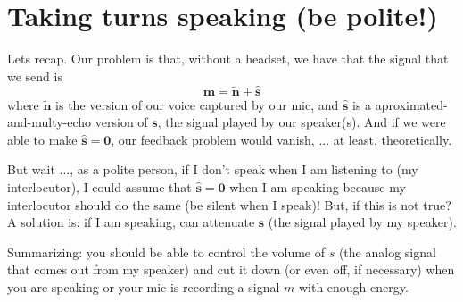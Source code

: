 \section{Taking turns speaking (be polite!)}
Lets recap. Our problem is that, without a headset, we have that the
signal that we send is
\begin{equation}
    \mathbf{m} = \tilde{\mathbf{n}} + \hat{\mathbf{s}}
\end{equation}
where $\tilde{\mathbf{n}}$ is the version of our voice captured by our
mic, and $\hat{\mathbf{s}}$ is a aproximated-and-multy-echo version of
$\mathbf{s}$, the signal played by our speaker(s). And if we were able
to make $\hat{\mathbf{s}}=\mathbf{0}$, our feedback problem would
vanish, ... at least, theoretically.

But wait ..., as a polite person, if I don't speak when I am listening
to (my interlocutor), I could assume that
$\hat{\mathbf{s}}=\mathbf{0}$ when I am speaking because my
interlocutor should do the same (be silent when I speak)! But, if this
is not true? A solution is: if I am speaking, can attenuate $\mathbf{s}$
(the signal played by my speaker).

Summarizing: you should be able to control the volume of $s$ (the
analog signal that comes out from my speaker) and cut it down (or
even off, if necessary) when you are speaking or your mic is recording
a signal $m$ with enough energy.

